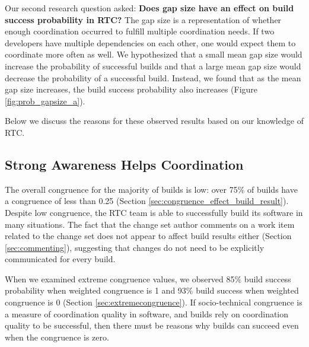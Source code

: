 Our second research question asked:
\textbf{Does gap size have an effect on build success probability
in RTC?}
The gap size is a representation of whether enough coordination
occurred to fulfill multiple coordination needs. If two developers have multiple dependencies on each other, one would expect them to
coordinate more often as well.
We hypothesized that a small mean gap size would increase the probability of successful builds and that a large mean gap size would decrease the probability of a successful build. Instead, we found that as the mean gap size increases, the build success probability also increases (Figure \ref{fig:prob_gapsize_a}).

Below we discuss the reasons for these observed results based on our knowledge of RTC.

\subsection{Strong Awareness Helps Coordination}

The overall congruence for the majority of builds is low: over 75\% of
builds have a congruence of less than 0.25 (Section \ref{sec:congruence_effect_build_result}).
Despite low congruence, the RTC team is able to successfully build its software in many situations.
The fact that the change set author comments on a work item related to the change set does not appear to affect build results either (Section \ref{sec:commenting}), suggesting that changes do not need to be explicitly communicated for every build.


When we examined extreme congruence values, we observed 85\% build success probability when weighted congruence is 1 and 93\% build success when weighted congruence is 0 (Section \ref{sec:extremecongruence}).
If socio-technical congruence is a measure of coordination quality in software, and builds rely on coordination quality to be successful, then there must be reasons why builds can succeed even when the congruence is zero.


